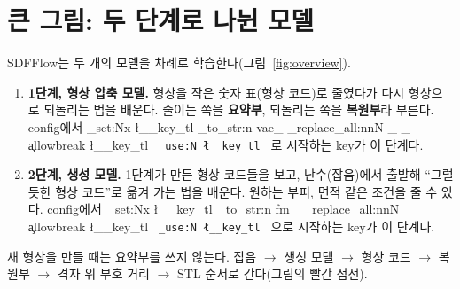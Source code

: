 \documentclass[11pt]{article}
\DeclareRobustCommand{\key}[1]{
  \tl_set:Nx \l__key_tl { \tl_to_str:n {#1} }
  \regex_replace_all:nnN { \_ } { \cO\_ \c{allowbreak} } \l__key_tl
  \texttt{ \tl_use:N \l__key_tl }
}
\begin{document}
\tableofcontents
\clearpage

\section{큰 그림: 두 단계로 나뉜 모델}
\label{sec:overview}

SDFFlow는 두 개의 모델을 차례로 학습한다(그림~\ref{fig:overview}).

\begin{enumerate}
\item \textbf{1단계, 형상 압축 모델.} 형상을 작은 숫자 표(형상 코드)로 줄였다가 다시 형상으로 되돌리는 법을 배운다.
줄이는 쪽을 \textbf{요약부}, 되돌리는 쪽을 \textbf{복원부}라 부른다. config에서 \key{vae_}로 시작하는 key가 이 단계다.
\item \textbf{2단계, 생성 모델.} 1단계가 만든 형상 코드들을 보고, 난수(잡음)에서 출발해 ``그럴듯한 형상 코드''로
옮겨 가는 법을 배운다. 원하는 부피, 면적 같은 조건을 줄 수 있다. config에서 \key{fm_}으로 시작하는 key가 이 단계다.
\end{enumerate}

새 형상을 만들 때는 요약부를 쓰지 않는다. 잡음 $\rightarrow$ 생성 모델 $\rightarrow$ 형상 코드 $\rightarrow$ 복원부
$\rightarrow$ 격자 위 부호 거리 $\rightarrow$ STL 순서로 간다(그림의 빨간 점선).
\end{document}
